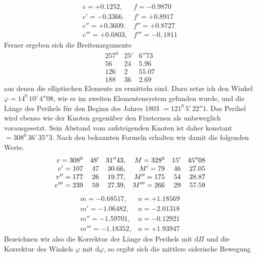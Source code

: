 \[
\begin{array}{ll}
c=+0.1252,&f=-0.9870\\
c'=-0.3366.&f'=+0.8917\\
c''=+0.3609.&f''=+0.8727\\
c'''=+0.6803,&f'''=-0{,}1811
\end{array}
\]
Ferner ergeben sich die Breitenargumente
\[
\begin{array}{rrr}
257^0&25'&6''73\\
56&24&5.96\\
126&2&55.07\\
188&36&2.69
\end{array}
\]
aus denen die elliptischen Elemente zu ermitteln sind. Dazu setze ich den Winkel $\varphi=14^0\,10'\,4''08$, wie er im zweiten Elementensystem gefunden wurde, und die Länge des Perihels für den Beginn des Jahres 1803 $=121^0\,5'\,22''1$. Das Perihel wird ebenso wie der Knoten gegenüber den Fixsternen als unbeweglich vorausgesetzt. Sein Abstand vom aufsteigenden Knoten ist daher konstant $=308^0\,36'\,35''3$. Nach den bekannten Formeln erhalten wir damit die folgenden Werte.
\[
\begin{array}{rrr@{\quad}rrr}
v=308^0&48'&31''43,&M=328^0&15'&45''08\\
v'=107&47&30.66,&M'=79&46&27.05\\
v''=177&26&19.77,&M''=175&54&28.87\\
v'''=239&59&27.39,&M'''=266&29&57.59
\end{array}
\]
\[
\begin{array}{ll}
m=-0.68517,&n=+1.18569\\
m'=-1.06482,&n=-2.01318\\
m''=-1.59701,&n=-0.12921\\
m'''=-1.18352,&n=+1.93947
\end{array}
\]
Bezeichnen wir also die Korrektur der Länge des Perihels mit $\mathrm d\Pi$ und die Korrektur des Winkels $\varphi$ mit $\mathrm d\varphi$, so ergibt sich die mittlere siderische Bewegung


